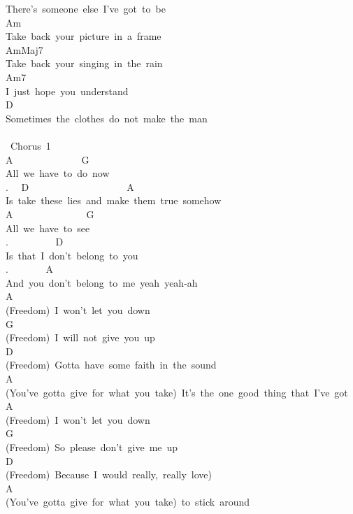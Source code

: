 {There's\ someone\ else\ I've\ got\ to\ be\\
Am\\
Take\ back\ your\ picture\ in\ a\ frame\\
AmMaj7\\
Take\ back\ your\ singing\ in\ the\ rain\\
Am7\\
I\ just\ hope\ you\ understand\\
D\\
Sometimes\ the\ clothes\ do\ not\ make\ the\ man\\
\\
\lbrack\ Chorus\ 1\rbrack\\
A\ \ \ \ \ \ \ \ \ \ \ \ \ \ G\\
All\ we\ have\ to\ do\ now\\
. \ \ D\ \ \ \ \ \ \ \ \ \ \ \ \ \ \ \ \ \ \ \ A\\
Is\ take\ these\ lies\ and\ make\ them\ true\ somehow\\
A\ \ \ \ \ \ \ \ \ \ \ \ \ \ \ G\\
All\ we\ have\ to\ see\\
. \ \ \ \ \ \ \ \ \ D\ \ \ \ \ \ \ \ \ \ \\
Is\ that\ I\ don't\ belong\ to\ you\\
. \ \ \ \ \ \ \ A\\
And\ you\ don't\ belong\ to\ me\ yeah\ yeah-ah\\
A\\
(Freedom)\ I\ won't\ let\ you\ down\\
G\\
(Freedom)\ I\ will\ not\ give\ you\ up\\
D\\
(Freedom)\ Gotta\ have\ some\ faith\ in\ the\ sound\\
A\\
(You've\ gotta\ give\ for\ what\ you\ take)\ It's\ the\ one\ good\ thing\ that\ I've\ got\\
A\\
(Freedom)\ I\ won't\ let\ you\ down\\
G\\
(Freedom)\ So\ please\ don't\ give\ me\ up\\
D\\
(Freedom)\ Because\ I\ would\ really,\ really\ love)\\
A\\
(You've\ gotta\ give\ for\ what\ you\ take)\ to\ stick\ around\\
\\
}
